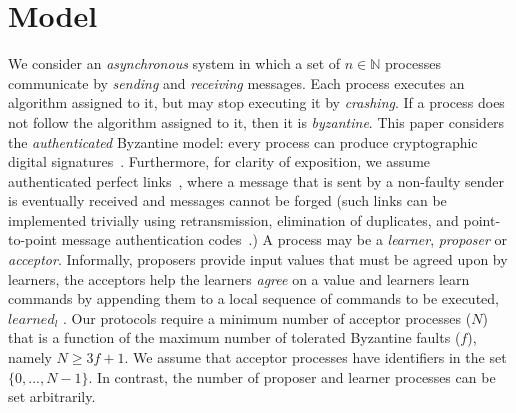 \section{Model}
\label{sec:model}
%
We consider an \emph{asynchronous} system in which
a set of $n \in \mathbb{N}$ processes communicate by 
\emph{sending} and \emph{receiving} messages.
Each process executes an algorithm assigned to it, but may stop executing it by \emph{crashing}.
If a process does not follow the algorithm assigned to it, then it is \emph{byzantine}.
This paper considers the \emph{authenticated} Byzantine model: every process can produce cryptographic digital signatures~\cite{quorum}. 
Furthermore, for clarity of exposition, we assume authenticated perfect links~\cite{cgr:book}, 
where a message that is sent by a non-faulty sender is eventually received and messages cannot be forged 
(such links can be implemented trivially using retransmission, elimination of duplicates, and point-to-point message authentication codes~\cite{cgr:book}.)
A process may be a \emph{learner}, \emph{proposer} or \emph{acceptor}.
Informally, proposers provide input values that must be agreed upon by learners, the acceptors help the learners \emph{agree} on a value and learners learn commands by appending them to a local sequence of commands to be executed, $learned_l$ .
Our protocols require a minimum number of acceptor processes ($N$) that is a function of the maximum number of tolerated Byzantine faults ($f$), namely $N \ge 3f+1$. We assume that acceptor processes have identifiers in the set $\{0,...,N-1\}$. In contrast, the number of proposer and learner processes can be set arbitrarily.

